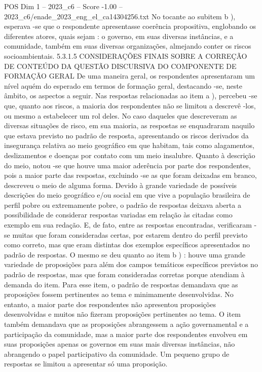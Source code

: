 \begin{textsample}{POS Dim 1 – 2023\_c6 – Score -1.00 – 2023\_c6/enade\_2023\_eng\_el\_ca14304256.txt}
No tocante ao subitem b ), esperava -se que o respondente apresentasse coerência propositiva, englobando os diferentes atores, quais sejam : o governo, em suas diversas instâncias, e a comunidade, também em suas diversas organizações, almejando conter os riscos socioambientais. 5.3.1.5 CONSIDERAÇÕES FINAIS SOBRE A CORREÇÃO DE CONTEÚDO DA QUESTÃO DISCURSIVA DO COMPONENTE DE FORMAÇÃO GERAL De uma maneira geral, os respondentes apresentaram um nível aquém do esperado em termos de formação geral, destacando -se, neste âmbito, os aspectos a seguir.
Nas respostas relacionadas ao item a ), percebeu -se que, quanto aos riscos, a maioria dos respondentes não se limitou a descrevê -los, ou mesmo a estabelecer um rol deles.
No caso daqueles que descreveram as diversas situações de risco, em sua maioria, as respostas se enquadraram naquilo que estava previsto no padrão de resposta, apresentando os riscos derivados da insegurança relativa ao meio geográfico em que habitam, tais como alagamentos, deslizamentos e doenças por contato com um meio insalubre.
Quanto à descrição do meio, notou -se que houve uma maior aderência por parte dos respondentes, pois a maior parte das respostas, excluindo -se as que foram deixadas em branco, descreveu o meio de alguma forma.
Devido à grande variedade de possíveis descrições do meio geográfico e/ou social em que vive a população brasileira de perfil pobre ou extremamente pobre, o padrão de respostas deixava aberta a possibilidade de considerar respostas variadas em relação às citadas como exemplo em sua redação.
E, de fato, entre as respostas encontradas, verificaram -se muitas que foram consideradas certas, por estarem dentro do perfil previsto como correto, mas que eram distintas dos exemplos específicos apresentados no padrão de respostas.
O mesmo se deu quanto ao item b ) : houve uma grande variedade de proposições para além dos campos temáticos específicos previstos no padrão de respostas, mas que foram consideradas corretas porque atendiam à demanda do item.
Para esse item, o padrão de respostas demandava que as proposições fossem pertinentes ao tema e minimamente desenvolvidas.
No entanto, a maior parte dos respondentes não apresentou proposições desenvolvidas e muitos não fizeram proposições pertinentes ao tema.
O item também demandava que as proposições abrangessem a ação governamental e a participação da comunidade, mas a maior parte dos respondentes envolveu em suas proposições apenas os governos em suas mais diversas instâncias, não abrangendo o papel participativo da comunidade.
Um pequeno grupo de respostas se limitou a apresentar só uma proposição.

\end{textsample}
